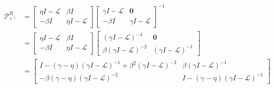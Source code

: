 \documentclass[a4paper,10pt]{article}
\begin{document}
\begin{align*}
\mathcal{P}_\gamma^R :&= \begin{bmatrix} \eta I - \mathcal{L} & \beta I \\
	-\beta I & \eta I - \mathcal{L} \end{bmatrix}
	\begin{bmatrix} \gamma I - \mathcal{L} & \mathbf{0} \\
		-\beta I & \gamma I - \mathcal{L} \end{bmatrix}^{-1} \\
& = \begin{bmatrix} \eta I - \mathcal{L} & \beta I \\
	-\beta I & \eta I - \mathcal{L} \end{bmatrix}
	\begin{bmatrix} (\gamma I - \mathcal{L})^{-1} & \mathbf{0} \\
		\beta (\gamma I - \mathcal{L})^{-2} & (\gamma I - \mathcal{L})^{-1} \end{bmatrix}\\
& = \begin{bmatrix} I - (\gamma -\eta )(\gamma I - \mathcal{L})^{-1} +
			\beta^2(\gamma I - \mathcal{L})^{-2} & 
		\beta (\gamma I - \mathcal{L})^{-1} \\
		-\beta (\gamma -\eta )(\gamma I - \mathcal{L})^{-2} & 
		I - (\gamma -\eta )(\gamma I - \mathcal{L})^{-1}
	\end{bmatrix} \\
\end{align*}
\end{document}
